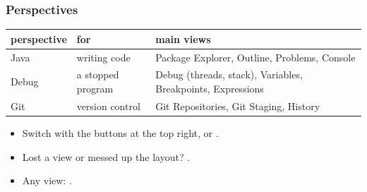 \documentclass[aspectratio=169,10pt,compress]{beamer}
\begin{document}
\begin{frame}[t,fragile] \frametitle{Perspectives}
  \begin{center}\small
  \begin{tabular}{lll}
    \toprule
    \textbf{perspective} & \textbf{for}               & \textbf{main views} \\
    \midrule
    Java                 & writing code               & Package Explorer, Outline, Problems, Console \\
    Debug                & a stopped program          & Debug (threads, stack), Variables, Breakpoints, Expressions \\
    Git                  & version control            & Git Repositories, Git Staging, History \\
    \bottomrule
  \end{tabular}
  \end{center}
  \begin{itemize}\small
    \item Switch with the buttons at the top right, or .
    \item Lost a view or messed up the layout? .
    \item Any view: .
  \end{itemize}
\end{frame}

\end{document}
